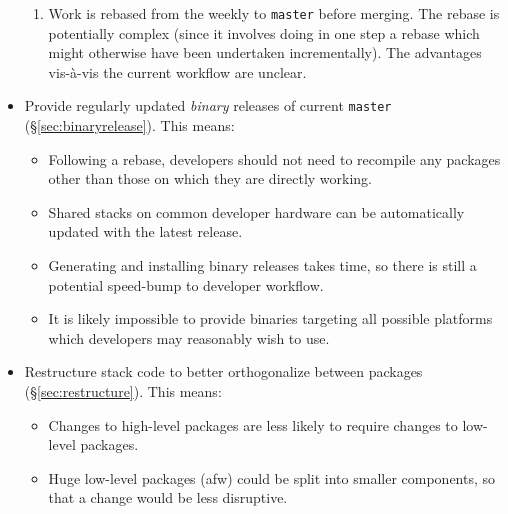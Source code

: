 \documentclass[DM,toc]{lsstdoc}
\begin{document}
\begin{itemize}
{\begin{itemize}
{\begin{enumerate}
          \item{Work is rebased from the weekly to \texttt{master} before
          merging. The rebase is potentially complex (since it involves doing
          in one step a rebase which might otherwise have been undertaken
          incrementally). The advantages vis-\`a-vis the current workflow are
          unclear.}

        \end{enumerate}

      }

    \end{itemize}

  }

  \item{Provide regularly updated \textit{binary} releases of current
  \texttt{master} (\S\ref{sec:binaryrelease}). This means:

    \begin{itemize}

      \item{Following a rebase, developers should not need to recompile any
      packages other than those on which they are directly working.}

      \item{Shared stacks on common developer hardware can be automatically
      updated with the latest release.}

      \item{Generating and installing binary releases takes time, so there is
      still a potential speed-bump to developer workflow.}

      \item{It is likely impossible to provide binaries targeting all possible
      platforms which developers may reasonably wish to use.}

    \end{itemize}

  }

  \item{Restructure stack code to better orthogonalize between packages
  (\S\ref{sec:restructure}). This means:

    \begin{itemize}

      \item{Changes to high-level packages are less likely to require changes
      to low-level packages.}

      \item{Huge low-level packages (afw) could be split into smaller
      components, so that a change would be less disruptive.}


\end{itemize}}
\end{itemize}
\end{document}
